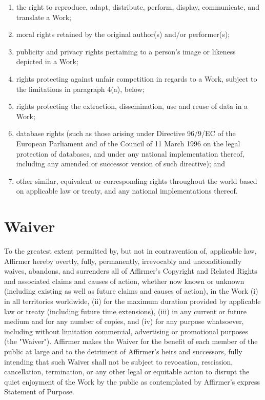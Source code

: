 \begin{enumerate}
\item the right to reproduce, adapt, distribute, perform, display, communicate,
      and translate a Work;
\item moral rights retained by the original author(s) and/or performer(s);
\item publicity and privacy rights pertaining to a person's image or likeness
      depicted in a Work;
\item rights protecting against unfair competition in regards to a Work, subject
      to the limitations in paragraph 4(a), below;
\item rights protecting the extraction, dissemination, use and reuse of data in
      a Work;
\item database rights (such as those arising under Directive 96/9/EC of the
      European Parliament and of the Council of 11 March 1996 on the legal
      protection of databases, and under any national implementation thereof,
      including any amended or successor version of such directive); and
\item other similar, equivalent or corresponding rights throughout the world
      based on applicable law or treaty, and any national implementations
      thereof.
\end{enumerate}

\section{Waiver}
To the greatest extent permitted by, but not in contravention of, applicable
law, Affirmer hereby overtly, fully, permanently, irrevocably and
unconditionally waives, abandons, and surrenders all of Affirmer's Copyright and
Related Rights and associated claims and causes of action, whether now known or
unknown (including existing as well as future claims and causes of action), in 
the Work (i) in all territories worldwide, (ii) for the maximum duration
provided by applicable law or treaty (including future time extensions),
(iii) in any current or future medium and for any number of copies, and (iv) for
any purpose whatsoever, including without limitation commercial, advertising or
promotional purposes (the "Waiver"). Affirmer makes the Waiver for the benefit
of each member of the public at large and to the detriment of Affirmer's heirs
and successors, fully intending that such Waiver shall not be subject to
revocation, rescission, cancellation, termination, or any other legal or
equitable action to disrupt the quiet enjoyment of the Work by the public as
contemplated by Affirmer's express Statement of Purpose.

